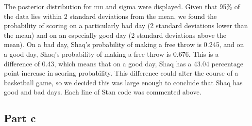 \documentclass{article}\usepackage[]{graphicx}\usepackage[]{color}
\begin{document}
\noindent The posterior distribution for mu and sigma were displayed. Given that 95\% of the data lies within 2 standard deviations from the mean, we found the probability of scoring on a particularly bad day (2 standard deviations lower than the mean) and on an especially good day (2 standard deviations above the mean). On a bad day, Shaq's probability of making a free throw is 0.245, and on a good day, Shaq's probability of making a free throw is 0.676. This is a difference of 0.43, which means that on a good day, Shaq has a 43.04 percentage point increase in scoring probability. This difference could alter the course of a basketball game, so we decided this was large enough to conclude that Shaq has good and bad days. Each line of Stan code was commented above. \\

\subsection*{Part c}
\end{document}
